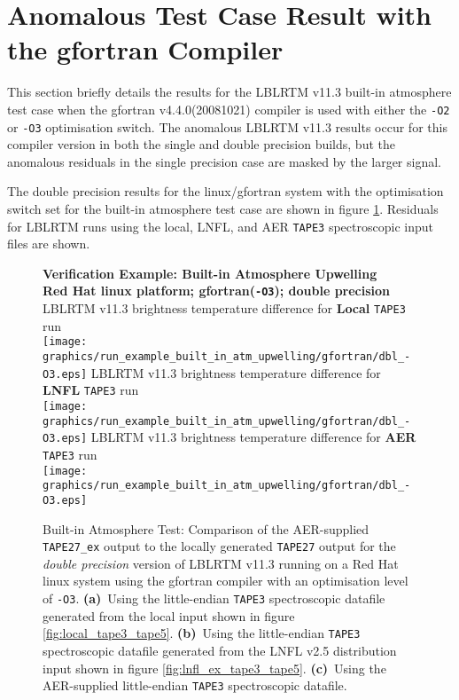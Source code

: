 \section{Anomalous Test Case Result with the gfortran Compiler}
\label{app:busted_gfortran_compiler_results}
This section briefly details the results for the LBLRTM v11.3 built-in atmosphere test case when the gfortran v4.4.0(20081021) compiler is used with either the \texttt{-O2} or \texttt{-O3} optimisation switch. The anomalous LBLRTM v11.3 results occur for this compiler version in both the single and double precision builds, but the anomalous residuals in the single precision case are masked by the larger signal.

The double precision results for the linux/gfortran system with the optimisation switch set for the built-in atmosphere test case are shown in figure \ref{fig:run_example_built_in_atm_upwelling-dbl_gfortran_-O3}. Residuals for LBLRTM runs using the local, LNFL, and AER \texttt{TAPE3} spectroscopic input files are shown.
 
\begin{figure}[htp]
  \centering
  \qquad\sffamily\textbf{Verification Example: Built-in Atmosphere Upwelling}\\
  \qquad\sffamily\textbf{Red Hat linux platform; gfortran(\texttt{-O3}); double precision}\\
  \qquad\textsf{LBLRTM v11.3 brightness temperature difference for \textbf{Local} \texttt{TAPE3} run}\\
  \texttt{[image: graphics/run\_example\_built\_in\_atm\_upwelling/gfortran/dbl\_-O3.eps]}
  \qquad\textsf{LBLRTM v11.3 brightness temperature difference for \textbf{LNFL} \texttt{TAPE3} run}\\
  \texttt{[image: graphics/run\_example\_built\_in\_atm\_upwelling/gfortran/dbl\_-O3.eps]}
  \qquad\textsf{LBLRTM v11.3 brightness temperature difference for \textbf{AER} \texttt{TAPE3} run}\\
  \texttt{[image: graphics/run\_example\_built\_in\_atm\_upwelling/gfortran/dbl\_-O3.eps]}
  \caption{Built-in Atmosphere Test: Comparison of the AER-supplied \texttt{TAPE27\_ex} output to the locally generated \texttt{TAPE27} output for the \textsl{double precision} version of LBLRTM v11.3 running on a Red Hat linux system using the gfortran compiler with an optimisation level of \texttt{-O3}. \mbox{\textbf{(a)} Using} the little-endian \texttt{TAPE3} spectroscopic datafile generated from the local input shown in figure \ref{fig:local_tape3_tape5}. \mbox{\textbf{(b)} Using} the little-endian \texttt{TAPE3} spectroscopic datafile generated from the LNFL v2.5 distribution input shown in figure \ref{fig:lnfl_ex_tape3_tape5}. \mbox{\textbf{(c)} Using} the AER-supplied little-endian \texttt{TAPE3} spectroscopic datafile.}
  \label{fig:run_example_built_in_atm_upwelling-dbl_gfortran_-O3}
\end{figure}

